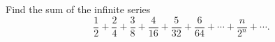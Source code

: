 Find the sum of the infinite series
\[\dfrac{1}{2}+\dfrac{2}{4}+\dfrac{3}{8}+\dfrac{4}{16}+\dfrac{5}{32}+\dfrac{6}{64}+\cdots+\dfrac{n}{2^n}+\cdots .\]
